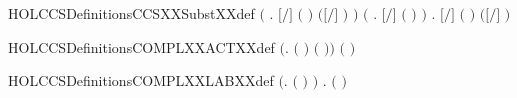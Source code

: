 \begin{SaveVerbatim}{HOLCCSDefinitionsCCSXXSubstXXdef}
   \ensuremath{(}\HOLSymConst{\HOLTokenForall{}}   . \ensuremath{[}\ensuremath{/}\ensuremath{]} \ensuremath{(}  \ensuremath{)} \HOLSymConst{\ensuremath{=}}  \ensuremath{(}\ensuremath{[}\ensuremath{/}\ensuremath{]} \ensuremath{)} \ensuremath{)} \HOLSymConst{\HOLTokenConj{}}
   \ensuremath{(}\HOLSymConst{\HOLTokenForall{}}  . \ensuremath{[}\ensuremath{/}\ensuremath{]} \ensuremath{(} \ensuremath{)} \HOLSymConst{\ensuremath{=}}   \HOLSymConst{\ensuremath{=}}      \ensuremath{)} \HOLSymConst{\HOLTokenConj{}}
   \HOLSymConst{\HOLTokenForall{}}   .
       \ensuremath{[}\ensuremath{/}\ensuremath{]} \ensuremath{(}  \ensuremath{)} \HOLSymConst{\ensuremath{=}}
         \HOLSymConst{\ensuremath{=}}         \ensuremath{(}\ensuremath{[}\ensuremath{/}\ensuremath{]} \ensuremath{)}
\end{SaveVerbatim}
\newcommand{\HOLCCSDefinitionsCCSXXSubstXXdef}{\UseVerbatim{HOLCCSDefinitionsCCSXXSubstXXdef}}
\begin{SaveVerbatim}{HOLCCSDefinitionsCOMPLXXACTXXdef}
\HOLTokenTurnstile{} \ensuremath{(}\HOLSymConst{\HOLTokenForall{}}.  \ensuremath{(} \ensuremath{)} \HOLSymConst{\ensuremath{=}}  \ensuremath{(} \ensuremath{)}\ensuremath{)} \HOLSymConst{\HOLTokenConj{}} \ensuremath{(} \HOLConst{\ensuremath{\tau}} \HOLSymConst{\ensuremath{=}} \HOLConst{\ensuremath{\tau}}\ensuremath{)}
\end{SaveVerbatim}
\newcommand{\HOLCCSDefinitionsCOMPLXXACTXXdef}{\UseVerbatim{HOLCCSDefinitionsCOMPLXXACTXXdef}}
\begin{SaveVerbatim}{HOLCCSDefinitionsCOMPLXXLABXXdef}
\HOLTokenTurnstile{} \ensuremath{(}\HOLSymConst{\HOLTokenForall{}}.  \ensuremath{(} \ensuremath{)} \HOLSymConst{\ensuremath{=}}  \ensuremath{)} \HOLSymConst{\HOLTokenConj{}}
   \HOLSymConst{\HOLTokenForall{}}.  \ensuremath{(} \ensuremath{)} \HOLSymConst{\ensuremath{=}}  
\end{SaveVerbatim}
